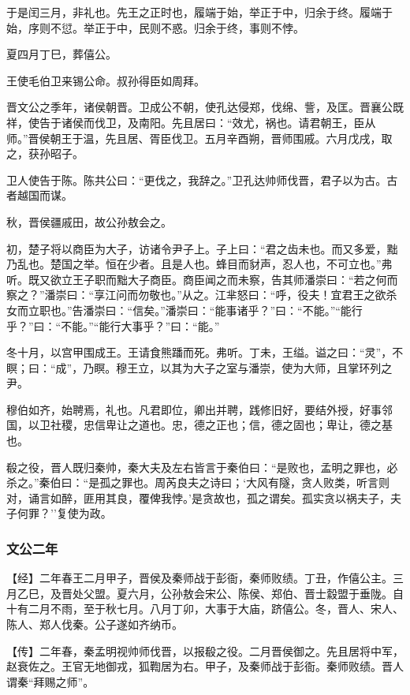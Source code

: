 \documentclass[]{article}
\begin{document}
于是闰三月，非礼也。先王之正时也，履端于始，举正于中，归余于终。履端于始，序则不愆。举正于中，民则不惑。归余于终，事则不悖。

夏四月丁巳，葬僖公。

王使毛伯卫来锡公命。叔孙得臣如周拜。

晋文公之季年，诸侯朝晋。卫成公不朝，使孔达侵郑，伐绵、訾，及匡。晋襄公既祥，使告于诸侯而伐卫，及南阳。先且居曰：``效尤，祸也。请君朝王，臣从师。''晋侯朝王于温，先且居、胥臣伐卫。五月辛酉朔，晋师围戚。六月戊戌，取之，获孙昭子。

卫人使告于陈。陈共公曰：``更伐之，我辞之。''卫孔达帅师伐晋，君子以为古。古者越国而谋。

秋，晋侯疆戚田，故公孙敖会之。

初，楚子将以商臣为大子，访诸令尹子上。子上曰：``君之齿未也。而又多爱，黜乃乱也。楚国之举。恒在少者。且是人也。蜂目而豺声，忍人也，不可立也。''弗听。既又欲立王子职而黜大子商臣。商臣闻之而未察，告其师潘崇曰：``若之何而察之？''潘崇曰：``享江问而勿敬也。''从之。江芈怒曰：``呼，役夫！宜君王之欲杀女而立职也。''告潘崇曰：``信矣。''潘崇曰：``能事诸乎？''曰：``不能。''``能行乎？''曰：``不能。''``能行大事乎？''曰：``能。''

冬十月，以宫甲围成王。王请食熊蹯而死。弗听。丁未，王缢。谥之曰：``灵''，不瞑；曰：``成''，乃瞑。穆王立，以其为大子之室与潘崇，使为大师，且掌环列之尹。

穆伯如齐，始聘焉，礼也。凡君即位，卿出并聘，践修旧好，要结外授，好事邻国，以卫社稷，忠信卑让之道也。忠，德之正也；信，德之固也；卑让，德之基也。

殽之役，晋人既归秦帅，秦大夫及左右皆言于秦伯曰：``是败也，孟明之罪也，必杀之。''秦伯曰：``是孤之罪也。周芮良夫之诗曰；`大风有隧，贪人败类，听言则对，诵言如醉，匪用其良，覆俾我悖。'是贪故也，孤之谓矣。孤实贪以祸夫子，夫子何罪？''复使为政。

\hypertarget{header-n1063}{%
\subsubsection{文公二年}\label{header-n1063}}

【经】二年春王二月甲子，晋侯及秦师战于彭衙，秦师败绩。丁丑，作僖公主。三月乙巳，及晋处父盟。夏六月，公孙敖会宋公、陈侯、郑伯、晋士縠盟于垂陇。自十有二月不雨，至于秋七月。八月丁卯，大事于大庙，跻僖公。冬，晋人、宋人、陈人、郑人伐秦。公子遂如齐纳币。

【传】二年春，秦孟明视帅师伐晋，以报殽之役。二月晋侯御之。先且居将中军，赵衰佐之。王官无地御戎，狐鞫居为右。甲子，及秦师战于彭衙。秦师败绩。晋人谓秦``拜赐之师''。
\end{document}
